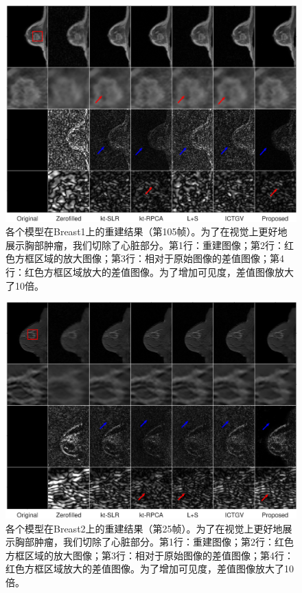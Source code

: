 \begin{figure}
\centering
\includegraphics[width=1\textwidth]{img/tgvnn/figure5_breast1.eps}
\caption{各个模型在Breast1上的重建结果（第105帧）。为了在视觉上更好地展示胸部肿瘤，我们切除了心脏部分。第1行：重建图像；第2行：红色方框区域的放大图像；第3行：相对于原始图像的差值图像；第4行：红色方框区域放大的差值图像。为了增加可见度，差值图像放大了10倍。}
\label{fig:breast1}
\end{figure} 

\begin{figure}
\centering
\includegraphics[width=1\textwidth]{img/tgvnn/breast2.eps}
\caption{各个模型在Breast2上的重建结果（第25帧）。为了在视觉上更好地展示胸部肿瘤，我们切除了心脏部分。第1行：重建图像；第2行：红色方框区域的放大图像；第3行：相对于原始图像的差值图像；第4行：红色方框区域放大的差值图像。为了增加可见度，差值图像放大了10倍。}
\label{fig:breast2}
\end{figure} 

